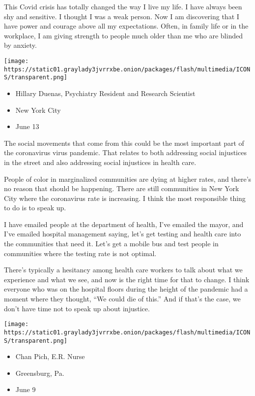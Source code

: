 This Covid crisis has totally changed the way I live my life. I have
always been shy and sensitive. I thought I was a weak person. Now I am
discovering that I have power and courage above all my expectations.
Often, in family life or in the workplace, I am giving strength to
people much older than me who are blinded by anxiety.

\texttt{[image: https://static01.graylady3jvrrxbe.onion/packages/flash/multimedia/ICONS/transparent.png]}

\begin{itemize}
\tightlist
\item
  Hillary Duenas, Psychiatry Resident and Research Scientist
\item
  New York City
\item
  June 13
\end{itemize}

The social movements that come from this could be the most important
part of the coronavirus virus pandemic. That relates to both addressing
social injustices in the street and also addressing social injustices in
health care.

People of color in marginalized communities are dying at higher rates,
and there's no reason that should be happening. There are still
communities in New York City where the coronavirus rate is increasing. I
think the most responsible thing to do is to speak up.

I have emailed people at the department of health, I've emailed the
mayor, and I've emailed hospital management saying, let's get testing
and health care into the communities that need it. Let's get a mobile
bus and test people in communities where the testing rate is not
optimal.

There's typically a hesitancy among health care workers to talk about
what we experience and what we see, and now is the right time for that
to change. I think everyone who was on the hospital floors during the
height of the pandemic had a moment where they thought, ``We could die
of this.'' And if that's the case, we don't have time not to speak up
about injustice.

\texttt{[image: https://static01.graylady3jvrrxbe.onion/packages/flash/multimedia/ICONS/transparent.png]}

\begin{itemize}
\tightlist
\item
  Chan Pich, E.R. Nurse
\item
  Greensburg, Pa.
\item
  June 9
\end{itemize}

